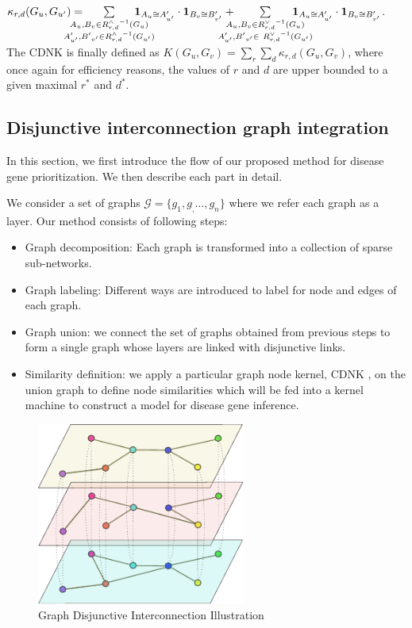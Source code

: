  $\kappa_{r,d}(G_u,G_{u'}) = \!\!\!\!\!\!\!\!\!\!\!\!
 \sum\limits_{\substack {A_u,{B}_{v} \in {R_{r,d}^{\wedge}}^{ -1}(G_u) \\ A'_{u'},{B'}_{v'} \in {R_{r,d}^{\wedge}}^{ -1}(G_{u'}) }} \!\!\!\!\!\!\!\!\!\!\!\!
  { \textbf{1}_{A_u \cong A'_{u'}} \cdot { \textbf{1}_{B_{v} \cong B'_{v'}}}}
+ \!\!\!\!\!\!\!\!\!\!\!\! \\
 \sum\limits_{\substack {A_u,{B}_{v} \in {R_{r,d}^{\vee}}^{ -1}(G_u) \\
  A'_{u'},{B'}_{v'} \in \ {R_{r,d}^{\vee}}^{ -1}(G_{u'}) }} \!\!\!\!\!\!\!\!\!\!\!\!
  { \textbf{1}_{A_u \cong A'_{u'}} \cdot { \textbf{1}_{B_{v} \cong B'_{v'}}}}
  $. \vspace{8pt}\\
The CDNK is finally defined as $K(G_u,G_v) = \sum\limits_{r}{\sum\limits_{d}{\kappa_{r,d}(G_u,G_v)}}$, where once again for efficiency reasons, the values of $r$ and $d$ are upper bounded to a given maximal $r^*$ and $d^*$.
\subsection{Disjunctive interconnection graph integration}
In this section, we first introduce the flow of our proposed method for disease gene prioritization. We then describe each part in detail.

We consider a set of graphs $\mathcal{G} = \lbrace g_1, g_,\ldots, g_n \rbrace$ where we refer each graph as a layer. Our method consists of following steps:
\begin{itemize}
\item Graph decomposition: Each graph is transformed into a collection of sparse sub-networks.
\item Graph labeling: Different ways are introduced to label for node and edges of each graph.
\item Graph union: we connect the set of graphs obtained from previous steps to form a single graph whose layers are linked with disjunctive links.
\item Similarity definition: we apply a particular graph node kernel, CDNK \cite{cdnk},  on the union graph to define node similarities which will be fed into a kernel machine to construct a model for disease gene inference.
\end{itemize} 

\begin{figure}[ht]
\includegraphics[width=0.9\columnwidth, height=6cm]{img/multilayers.pdf}
\caption{Graph Disjunctive Interconnection Illustration}
\label{fig:graph_interconnection}
\end{figure}

